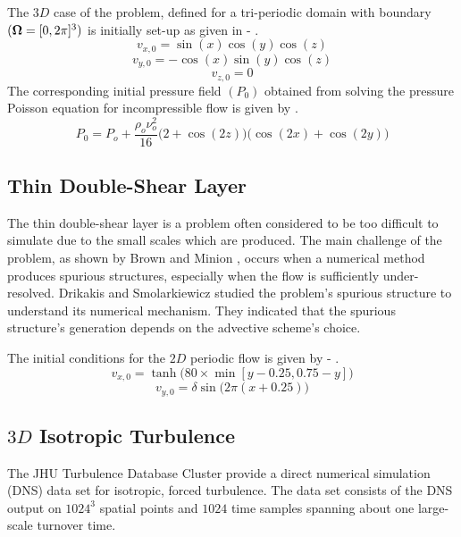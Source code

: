 The $3D$ case of the problem, defined for a tri-periodic domain with boundary $(\bm{\Omega} = [0, 2\pi]^3)$ is initially set-up as given in  - .
\begin{equation}
    v_{x, 0} = \sin(x) \cos(y) \cos(z)
    \label{eq:3d-tgv-vx}
\end{equation}
\begin{equation}
    v_{y, 0} = -\cos(x) \sin(y) \cos(z)
    \label{eq:3d-tgv-vy}
\end{equation}
\begin{equation}
    v_{z, 0} = 0
    \label{eq:3d-tgv-vz}
\end{equation}
The corresponding initial pressure field $(P_0)$ obtained from solving the pressure Poisson equation for incompressible flow is given by  \parencite{pereira2021modeling}.
\begin{equation}
    P_{0} = P_o + \frac{\rho_o \nu_o^2}{16} \bigg(2 + \cos(2z) \bigg) \bigg(\cos(2x) + \cos(2y) \bigg)
    \label{eq:3d-tgv-p}
\end{equation}

\subsection{Thin Double-Shear Layer}
The thin double-shear layer is a problem often considered to be too difficult to simulate due to the small scales which are produced. 
The main challenge of the problem, as shown by Brown and Minion \parencite{minion1997performance}, occurs when a numerical method produces spurious structures, especially when the flow is sufficiently under-resolved. 
Drikakis and Smolarkiewicz \parencite{drikakis2001spurious} studied the problem's spurious structure to understand its numerical mechanism. They indicated that the spurious structure's generation depends on the advective scheme's choice. 

The initial conditions for the $2D$ periodic flow is given by  - .
\begin{equation}
    v_{x, 0} = \tanh \big(80 \times \min[y-0.25, 0.75-y] \big)
    \label{eq:2d-tdsl-vx}
\end{equation}
\begin{equation}
    v_{y, 0} = \delta \sin \big( 2\pi (x+0.25) \big)
    \label{eq:2d-tdsl-vy}
\end{equation}

\subsection[3D Isotropic Turbulence]{$3D$ Isotropic Turbulence}
The JHU Turbulence Database Cluster \parencite{li2008public} provide a direct numerical simulation (DNS) data set for isotropic, forced turbulence. The data set consists of the DNS output on $1024^3$ spatial points and $1024$ time samples spanning about one large-scale turnover time.

